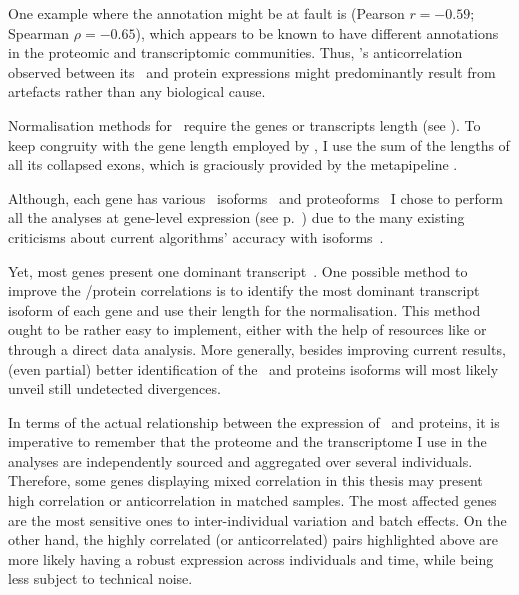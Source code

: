 One example where the annotation might be at fault is
 (Pearson $r=-0.59$; Spearman $\rho=-0.65$),
which appears to be known to have different annotations
in the proteomic and transcriptomic communities.
Thus, 's anticorrelation observed
between its \mRNA\ and protein expressions
might predominantly result from artefacts
rather than any biological cause.\mybr\

Normalisation methods for \Rnaseq\ require the genes or transcripts length
(see ).
To keep congruity with the gene length
employed by ,
I use the sum of the lengths of all its collapsed exons,
which is graciously provided by the metapipeline
.

Although, each gene has various \mRNA\ isoforms~
and proteoforms~
I chose to perform all the analyses at gene-level expression
(see p.~\pageref{minisec:quantNorm})
due to the many existing criticisms about
current algorithms' accuracy with isoforms~.\mybr\

Yet, most genes present one dominant transcript~.
One possible method to improve the \mRNA/protein correlations
is to identify the most dominant transcript isoform of each gene
and use their length for the normalisation.
This method ought to be rather easy to implement,
either with the help of resources like
or through a direct data analysis.
More generally,
besides improving current results,
(even partial) better identification of the \mRNAs\ and proteins isoforms
will most likely unveil still undetected divergences.\mybr\

In terms of the actual relationship between the expression of \mRNAs\ and proteins,
it is imperative to remember that the proteome and the transcriptome I use
in the analyses are independently sourced and aggregated over several individuals.
Therefore, some genes displaying mixed correlation in this thesis may present
high correlation or anticorrelation in matched samples.
The most affected genes are the most sensitive ones
to inter-individual variation and batch effects.
On the other hand,
the highly correlated (or anticorrelated) pairs highlighted above
are more likely having a robust expression across individuals and time,
while being less subject to technical noise.\mybr\

